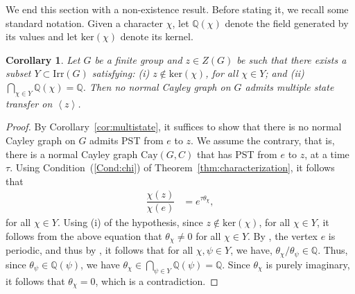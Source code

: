 \documentclass{amsart}
\theoremstyle{plain}
\newtheorem{cor}[theorem]{Corollary}
\theoremstyle{remark}\newtheorem{con}[theorem]{Construction}
\theoremstyle{remark} \newtheorem*{remark}{Remark}
\theoremstyle{remark} \newtheorem{example}{Example}
\newcommand{\bb}{\mathbb}
\newcommand{\mrm}{\mathrm}
\newcommand{\irr}{\mathrm{Irr}}
\begin{document}
We end this section with a non-existence result. Before stating it, we recall some standard notation. Given a character $\chi$, let $\bb{Q}(\chi)$ denote the field generated 
by its values and let $\mrm{ker}(\chi)$ denote its kernel. 
\begin{cor}\label{cor:non-exist}
 Let $G$ be a finite group and $z \in Z(G)$ be such that there exists a subset $Y\subset \irr(G)$ satisfying:
 (i) $z \notin \mrm{ker}(\chi)$, for all $\chi \in Y$; and (ii) $\bigcap\limits_{\chi \in Y} \bb{Q}(\chi)= \bb{Q}$. Then no normal Cayley graph on $G$ admits multiple state transfer on $\left\langle z \right\rangle$. 
\end{cor}
\begin{proof}
By Corollary~\ref{cor:multistate}, it suffices to show that there is no normal Cayley graph on $G$ admits PST from $e$ to $z$. We assume the contrary, that is, there is a normal Cayley graph $\mrm{Cay}(G,C)$ that has PST from $e$ to $z$, at a time $\tau$.  Using Condition~(\ref{Cond:chi}) of Theorem~\ref{thm:characterization}, it follows that
\begin{subequations}
    \begin{align*}
        \dfrac{\chi(z)}{\chi(e)} &=e^{\tau \theta_{\chi}},
    \end{align*}
\end{subequations}
for all $\chi \in Y$.
Using (i) of the hypothesis, since $z\notin \mrm{ker}(\chi)$, for all $\chi \in Y$, it follows from the above equation that $\theta_{\chi}\neq 0$ for all $\chi \in Y$.  By \cite[Theorem 7.1]{godsil2020perfect}, the vertex $e$ is periodic, and thus by \cite[Theorem~6.1]{godsil2020perfect}, it follows that for all $\chi,\psi \in Y$, we have, $\theta_{\chi}/\theta_{\psi} \in \bb{Q}$. Thus, since $\theta_{\psi}\in \bb{Q}(\psi)$,  we have $\theta_{\chi} \in \bigcap\limits_{\psi \in Y} \bb{Q}(\psi) =\bb{Q}$. Since $\theta_{\chi}$ is purely imaginary, it follows that $\theta_{\chi}=0$, which is a contradiction.  
\end{proof}


\end{document}
